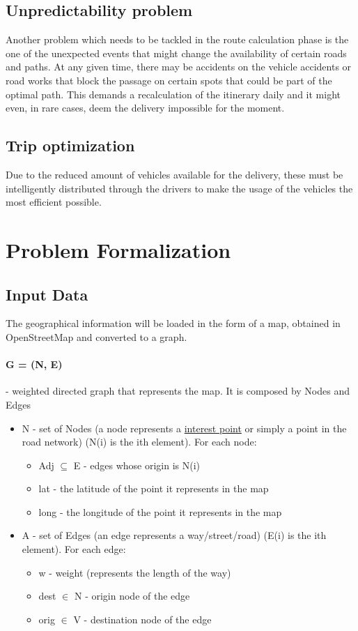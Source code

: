 \documentclass[12pt]{article}
\begin{document}
\subsection{Unpredictability problem}
Another problem which needs to be tackled in the route calculation phase is the one of the unexpected events that might change the availability of certain roads and paths. At any given time, there may be accidents on the vehicle accidents or road works that block the passage on certain spots that could be part of the optimal path. This demands a recalculation of the itinerary daily and it might even, in rare cases, deem the delivery impossible for the moment.


\subsection{Trip optimization}
Due to the reduced amount of vehicles available for the delivery, these must be intelligently distributed through the drivers to make the usage of the vehicles the most efficient possible.


\newpage
\section{Problem Formalization}


\subsection{Input Data}
The geographical information will be loaded in the form of a map, obtained in OpenStreetMap and converted to a graph.
\paragraph{G = (N, E)} - weighted directed graph that represents the map. It is composed by Nodes and Edges
\begin{itemize}

	\item N - set of Nodes (a node represents a \uline{interest point} or simply a point in the road network) (N(i) is the ith element). For each node:
\begin{itemize}
	\item Adj $ \subseteq $  E - edges whose origin is N(i)
	\item lat - the latitude of the point it represents in the map
	\item long - the longitude of the point it represents in the map
\end{itemize}

	\item A - set of Edges (an edge represents a way/street/road) (E(i) is the ith element). For each edge:
\begin{itemize}
	\item w - weight (represents the length of the way)
	\item dest $ \in $  N - origin node of the edge
	\item orig $ \in $  V - destination node of the edge
\end{itemize}

\end{itemize}
\end{document}
